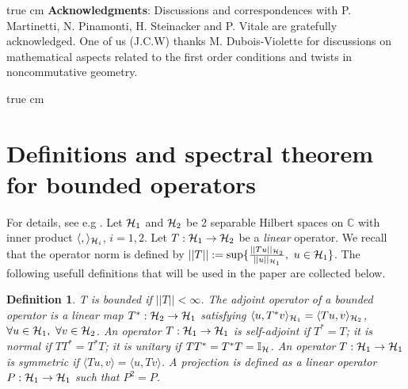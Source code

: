 \documentclass[a4paper]{jpconf}
\numberwithin{equation}{section}
\newcommand\bbone{{ \mathbb{I}}}
\newtheorem{adefinition}{Definition}
\theoremstyle{nonumberplain}
\begin{document}

 true cm
{\bf{Acknowledgments}}: Discussions and correspondences with P. Martinetti, N. Pinamonti, H. Steinacker and P. Vitale are gratefully acknowledged. One of us (J.C.W) thanks M. Dubois-Violette for discussions on mathematical aspects related to the first order conditions and twists in noncommutative geometry.


 true cm

\setcounter{section}{0}
\appendix



\section{Definitions and spectral theorem for bounded operators}\label{appendix1}

For details, see e.g \cite{orthop-1}. Let ${\cal{H}}_1$ and ${\cal{H}}_2$ be 2 separable Hilbert spaces on $\mathbb{C}$ with inner product $\langle, \rangle_{{\cal{H}}_i}$, $i=1,2$. Let $T:{\cal{H}}_1\to{\cal{H}}_2$ be a {\it{linear}} operator. We recall that the operator norm is defined by $||T||:=\sup\{\frac{||Tu||_{{\cal{H}}_2}}{||u||_{{\cal{H}}_1}},\ u\in{\cal{H}}_1 \}$. The following usefull definitions that will be used in the paper are collected below.

\begin{adefinition}
T is bounded if $||T||<\infty$. The adjoint operator of a bounded operator is a linear map $T^*:{\cal{H}}_2\to{\cal{H}}_1$ satisfying $\langle u, T^*v\rangle_{{\cal{H}}_1}=\langle Tu,v \rangle_{{\cal{H}}_2}$, $\forall u\in{\cal{H}}_1,\ \forall v\in{\cal{H}}_2$. An operator $T:{\cal{H}}_1\to{\cal{H}}_1$ is 
self-adjoint if $T^*=T$; it is normal if $TT^*=T^*T$; it is unitary if $TT^*=T^*T=\bbone_{\cal{H}}$. An operator $T:{\cal{H}}_1\to{\cal{H}}_1$ is symmetric if $\langle Tu,v \rangle=\langle u,Tv\rangle$. A projection is defined as a linear operator $P:{\cal{H}}_1\to{\cal{H}}_1$ such that $P^2=P$.
\end{adefinition}
\end{document}
